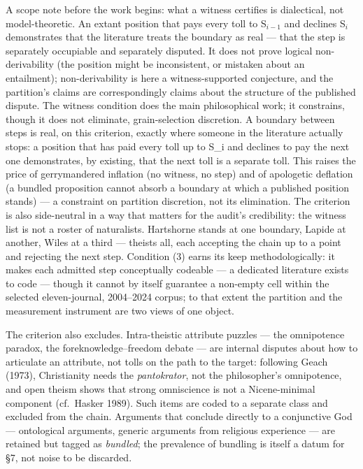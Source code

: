 A scope note before the work begins: what a witness certifies is dialectical, not model-theoretic. An extant position that pays every toll to S\(_{i-1}\) and declines S\(_i\) demonstrates that the literature treats the boundary as real --- that the step is separately occupiable and separately disputed. It does not prove logical non-derivability (the position might be inconsistent, or mistaken about an entailment); non-derivability is here a witness-supported conjecture, and the partition's claims are correspondingly claims about the structure of the published dispute. The witness condition does the main philosophical work; it constrains, though it does not eliminate, grain-selection discretion. A boundary between steps is real, on this criterion, exactly where someone in the literature actually stops: a position that has paid every toll up to S\_i and declines to pay the next one demonstrates, by existing, that the next toll is a separate toll. This raises the price of gerrymandered inflation (no witness, no step) and of apologetic deflation (a bundled proposition cannot absorb a boundary at which a published position stands) --- a constraint on partition discretion, not its elimination. The criterion is also side-neutral in a way that matters for the audit's credibility: the witness list is not a roster of naturalists. Hartshorne stands at one boundary, Lapide at another, Wiles at a third --- theists all, each accepting the chain up to a point and rejecting the next step. Condition (3) earns its keep methodologically: it makes each admitted step conceptually codeable --- a dedicated literature exists to code --- though it cannot by itself guarantee a non-empty cell within the selected eleven-journal, 2004--2024 corpus; to that extent the partition and the measurement instrument are two views of one object.

The criterion also excludes. Intra-theistic attribute puzzles --- the omnipotence paradox, the foreknowledge--freedom debate --- are internal disputes about how to articulate an attribute, not tolls on the path to the target: following Geach (1973), Christianity needs the \emph{pantokrator}, not the philosopher's omnipotence, and open theism shows that strong omniscience is not a Nicene-minimal component (cf.~Hasker 1989). Such items are coded to a separate class and excluded from the chain. Arguments that conclude directly to a conjunctive God --- ontological arguments, generic arguments from religious experience --- are retained but tagged as \emph{bundled}; the prevalence of bundling is itself a datum for \S{}7, not noise to be discarded.

